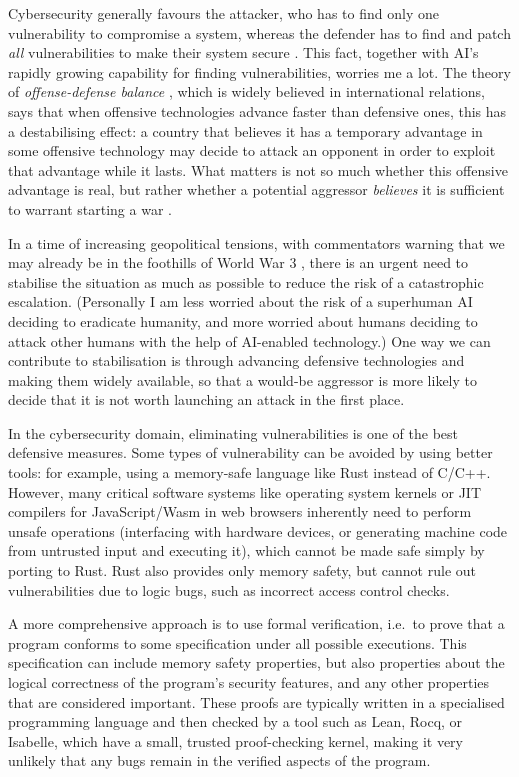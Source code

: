 \documentclass{article}
\begin{document}
Cybersecurity generally favours the attacker, who has to find only one vulnerability to compromise a system, whereas the defender has to find and patch \emph{all} vulnerabilities to make their system secure \citep{ryseff-2017-cyberwarfare}.
This fact, together with AI's rapidly growing capability for finding vulnerabilities, worries me a lot.
The theory of \emph{offense-defense balance} \citep{jervis-1978-balance}, which is widely believed in international relations, says that when offensive technologies advance faster than defensive ones, this has a destabilising effect: a country that believes it has a temporary advantage in some offensive technology may decide to attack an opponent in order to exploit that advantage while it lasts.
What matters is not so much whether this offensive advantage is real, but rather whether a potential aggressor \emph{believes} it is sufficient to warrant starting a war \citep{ryseff-2017-cyberwarfare}.

In a time of increasing geopolitical tensions, with commentators warning that we may already be in the foothills of World War 3 \citep{smith-2026-foothills}, there is an urgent need to stabilise the situation as much as possible to reduce the risk of a catastrophic escalation.
(Personally I am less worried about the risk of a superhuman AI deciding to eradicate humanity, and more worried about humans deciding to attack other humans with the help of AI-enabled technology.)
One way we can contribute to stabilisation is through advancing defensive technologies and making them widely available, so that a would-be aggressor is more likely to decide that it is not worth launching an attack in the first place.

In the cybersecurity domain, eliminating vulnerabilities is one of the best defensive measures.
Some types of vulnerability can be avoided by using better tools: for example, using a memory-safe language like Rust instead of C/C++.
However, many critical software systems like operating system kernels or JIT compilers for JavaScript/Wasm in web browsers inherently need to perform unsafe operations (interfacing with hardware devices, or generating machine code from untrusted input and executing it), which cannot be made safe simply by porting to Rust.
Rust also provides only memory safety, but cannot rule out vulnerabilities due to logic bugs, such as incorrect access control checks.

A more comprehensive approach is to use formal verification, i.e.\ to prove that a program conforms to some specification under all possible executions.
This specification can include memory safety properties, but also properties about the logical correctness of the program's security features, and any other properties that are considered important.
These proofs are typically written in a specialised programming language and then checked by a tool such as Lean, Rocq, or Isabelle, which have a small, trusted proof-checking kernel, making it very unlikely that any bugs remain in the verified aspects of the program.
\end{document}

